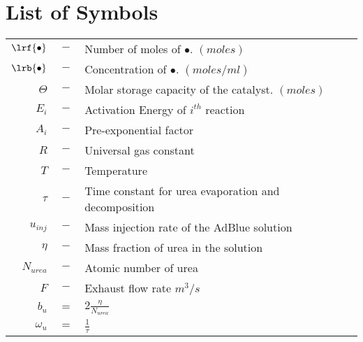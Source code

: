 \section*{List of Symbols}

\begin{table}[H]
    \begin{tabular}{r c l}
        $\lrf{\bullet}$ &$-$& Number of moles of $\bullet$. $(moles)$\\
        $\lrb{\bullet}$ &$-$& Concentration of $\bullet$. $(moles/ml)$\\
        $\Theta$ &$-$& Molar storage capacity of the catalyst. $(moles)$\\
        $E_i$ &$-$& Activation Energy of $i^{th}$ reaction\\
        $A_i$ &$-$& Pre-exponential factor\\
        $R$ &$-$& Universal gas constant\\
        $T$ &$-$& Temperature\\
        $\tau$ &$-$& Time constant for urea evaporation and decomposition\\
        $u_{inj}$ &$-$& Mass injection rate of the AdBlue solution\\
        $\eta$ &$-$& Mass fraction of urea in the solution\\
        $N_{urea}$ &$-$& Atomic number of urea\\
        $F$ &$-$& Exhaust flow rate $m^3/s$\\
        $b_u$ &$=$& $2 \frac{ \eta}{N_{urea}}$\\
        $\omega_u$ &$=$& $\frac{1}{\tau}$\\
    \end{tabular}
\end{table}
